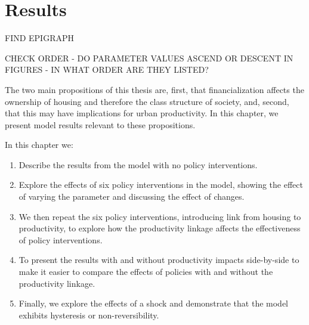 \chapter{Results} \label{chapter-results}


{\color{red} 

FIND EPIGRAPH

CHECK ORDER - DO PARAMETER VALUES ASCEND OR DESCENT IN FIGURES - IN WHAT ORDER ARE THEY LISTED?}


The two main propositions of this thesis are, first, that financialization affects the ownership of housing and therefore the class structure of society, and, second, that this may have implications for urban productivity.  In this chapter, we present model results relevant to these propositions.

In this chapter we:
\begin{enumerate}
    \item %
    Describe the results from the model with no policy interventions. 
    \item Explore the effects of six policy interventions in the model, %
    showing the effect of varying the parameter and discussing the effect of changes. 
    \item %
    We then repeat the six policy interventions, introducing link from housing to productivity, to explore how the productivity linkage affects the effectiveness of policy interventions. %
    \item %
     To present the results with and without productivity impacts side-by-side to make it easier to compare the effects of policies with and without the productivity linkage. 
     \item Finally, we explore the effects of a shock %
     and demonstrate that the model exhibits \gls{hysteresis} or non-reversibility.
     
\end{enumerate}



